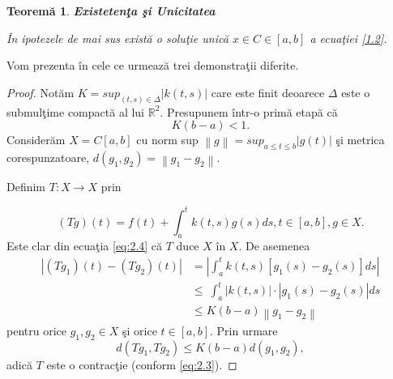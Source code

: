 \documentclass[a4paper,12pt,oneside]{report}
\newtheorem{theorem}{Teorem\u a}
\begin{document}
\begin{theorem}
\textbf{Existeten\c{t}a \c{s}i Unicitatea}

\^{I}n ipotezele de mai sus exist\u{a} o solu\c{t}ie unic\u{a} \(x\in C\in \left [ a,b \right ]\) a ecua\c{t}iei \ref{1.2}.

\end{theorem}
\noindent Vom prezenta \^{i}n cele ce urmeaz\u{a} trei demonstra\c{t}ii diferite.
\begin{proof}

Not\u{a}m \(K = sup_{\left ( t,s \right )\in \Delta }\left | k\left ( t,s \right ) \right |\) care este finit deoarece \(\Delta\) este o submul\c{t}ime compact\u{a} al lui \(\mathbb{R}^{2}\). Presupunem \^{i}ntr-o prim\u{a} etap\u{a} c\u{a}
\begin{displaymath}
K\left ( b-a \right ) < 1. \label{eq:2.3} \tag{2.3}
\end{displaymath}
Consider\u{a}m \(X = C\left [ a,b \right ]\)  cu norm sup \(\left \| g \right \| = sup_{a\leq t\leq b}\left | g\left ( t \right ) \right |\)  \c{s}i metrica corespunzatoare, \(d\left ( g_{1}, g_{2} \right ) = \left \| g_{1} - g_{2} \right \|\).

\noindent Definim \(T : X \rightarrow X\) prin

\begin{displaymath}
\left ( Tg \right )\left ( t \right ) = f\left ( t \right ) + \int_{a}^{t}k\left ( t,s \right )g\left ( s \right )ds, t\in \left [ a,b \right ], g\in X. \label{eq:2.4} \tag{2.4}
\end{displaymath}
Este clar din ecua\c{t}ia \ref{eq:2.4} c\u{a} \(T\) duce \(X\) \^{i}n  \(X\). De asemenea
\begin{equation}\nonumber
\begin{split}
\left | \left ( Tg_{1} \right )\left ( t \right ) - \left ( Tg_{2} \right )\left ( t \right )  \right | &= \left | \int_{a}^{t}k\left ( t,s \right )\left [ g_{1}\left ( s \right ) - g_{2}\left ( s \right ) \right ]ds \right | \\ & \leq \ \int_{a}^{t}\left | k\left ( t,s \right ) \right |\cdot \left | g_{1}\left ( s \right ) - g_{2}\left ( s \right ) \right |ds \\ & \leq K \left ( b-a \right )\left \| g_{1} - g_{2} \right \|
\end{split}
\end{equation}
pentru orice \(g_{1}, g_{2} \in X\) \c{s}i orice  \(t\in \left [ a,b \right ]\).
Prin urmare
\begin{displaymath}
d\left ( Tg_{1} , Tg_{2}\right )\leq K\left ( b-a \right )d\left ( g_{1}, g_{2} \right ),
\end{displaymath}
adic\u{a} \(T\) este o contrac\c{t}ie (conform \ref{eq:2.3}).


\end{proof}
\end{document}

